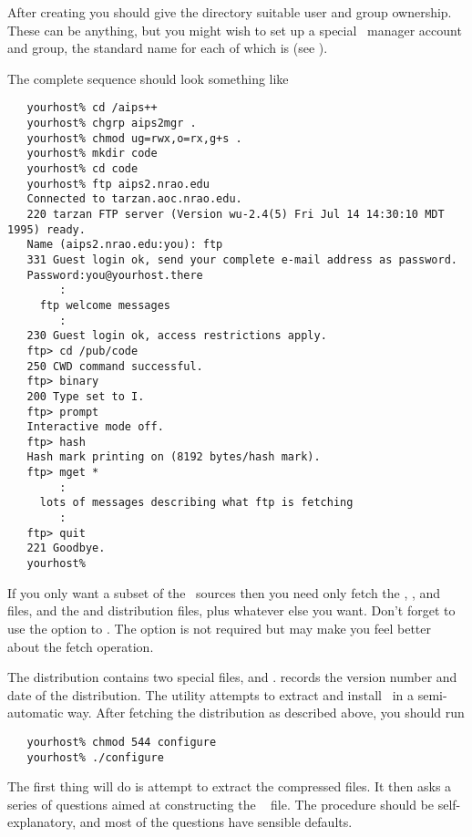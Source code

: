 After creating  you should give the directory suitable user and
group ownership.  These can be anything, but you might wish to set up a
special \aipspp\ manager account and group, the standard name for each of
which is  (see ).

The complete  sequence should look something like

\begin{verbatim}
   yourhost% cd /aips++
   yourhost% chgrp aips2mgr .
   yourhost% chmod ug=rwx,o=rx,g+s .
   yourhost% mkdir code
   yourhost% cd code
   yourhost% ftp aips2.nrao.edu
   Connected to tarzan.aoc.nrao.edu.
   220 tarzan FTP server (Version wu-2.4(5) Fri Jul 14 14:30:10 MDT 1995) ready.
   Name (aips2.nrao.edu:you): ftp
   331 Guest login ok, send your complete e-mail address as password.
   Password:you@yourhost.there
        :
     ftp welcome messages
        :
   230 Guest login ok, access restrictions apply.
   ftp> cd /pub/code
   250 CWD command successful.
   ftp> binary
   200 Type set to I.
   ftp> prompt
   Interactive mode off.
   ftp> hash
   Hash mark printing on (8192 bytes/hash mark).
   ftp> mget *
        :
     lots of messages describing what ftp is fetching
        :
   ftp> quit
   221 Goodbye.
   yourhost%
\end{verbatim}

\noindent
If you only want a subset of the \aipspp\ sources then you need only fetch the
, , and  files, and the
 and  distribution  files, plus whatever
else you want.  Don't forget to use the  option to .
The  option is not required but may make you feel better about the
fetch operation.

The distribution contains two special files,  and
.   records the version number and date of the
distribution.  The  utility attempts to extract and install
\aipspp\ in a semi-automatic way.  After fetching the distribution as
described above, you should run 

\begin{verbatim}
   yourhost% chmod 544 configure
   yourhost% ./configure
\end{verbatim}

\noindent
The first thing  will do is attempt to extract the
compressed  files.  It then asks a series of questions aimed at
constructing the \aipspp\  file.  The procedure should be
self-explanatory, and most of the questions have sensible defaults.

